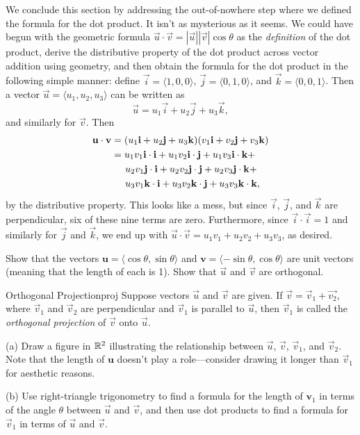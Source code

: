 \documentclass{watsonbook}
\begin{document}
We conclude this section by addressing the out-of-nowhere step where
we defined the formula for the dot product. It isn't as mysterious as
it seems. We could have begun with the geometric formula
$\vec{u} \cdot \vec{v} = |\vec{u}| |\vec{v}| \cos\theta$
as the \textit{definition} of the dot product, derive the distributive
property of the dot product across vector addition using geometry, and
then obtain the formula for the dot product in the following simple
manner: define $\vec{i} = \langle1,0,0\rangle$,
$\vec{j} = \langle0,1,0\rangle$, and
$\vec{k} = \langle0,0,1\rangle$. Then a vector
$\vec{u} = \langle u_1, u_2, u_3\rangle$ can be written as
\[
\vec{u} = u_1 \vec{i} + u_2 \vec{j} + u_3 \vec{k},
\]
and similarly for $\vec{v}$. Then 
\begin{align*}
  \vec{u} \cdot \vec{v} &= (u_1 \vec{i} + u_2 \vec{j} + u_3
  \vec{k})(v_1 \vec{i} + v_2 \vec{j} + v_3 \vec{k})  \\
  &= u_1 v_1 \vec{i} \cdot \vec{i} + u_1 v_2 \vec{i} \cdot
    \vec{j}  + u_1 v_3 \vec{i} \cdot \vec{k}  + \\ 
  &\hspace{5mm}  u_2 v_1 \vec{j} \cdot \vec{i} + u_2 v_2 \vec{j} \cdot
    \vec{j}  + u_2 v_3 \vec{j} \cdot \vec{k}  + \\ 
  &\hspace{5mm}  u_3 v_1 \vec{k} \cdot \vec{i} + u_3 v_2 \vec{k} \cdot
    \vec{j}  + u_3 v_3 \vec{k} \cdot \vec{k},
\end{align*}
by the distributive property. This looks like a mess, but since
$\vec{i}$,  $\vec{j}$, and  $\vec{k}$ are 
perpendicular, six of these nine terms are zero. Furthermore, since
$\vec{i}\cdot \vec{i} = 1$ and similarly for $\vec{j}$ and
$\vec{k}$, we end up with $  \vec{u} \cdot \vec{v}  = u_1 v_1
+ u_2 v_2 + u_3 v_3$, as desired.

\begin{exercise}{}{}
  Show that the vectors
  $\mathbf{u} = \langle \cos \theta, \sin \theta \rangle$ and
  $\mathbf{v} = \langle -\sin \theta, \cos \theta \rangle$ are unit
  vectors (meaning that the length of each is 1). Show that $\vec{u}$
  and $\vec{v}$ are orthogonal.
\end{exercise}

\begin{exercise}{Orthogonal Projection}{proj}
  Suppose vectors $\vec{u}$ and $\vec{v}$ are given. If
  $\vec{v} = \vec{v}_1 + \vec{v_2}$, where $\vec{v}_1$ and
  $\vec{v}_2$ are perpendicular and $\vec{v}_1$ is parallel to
  $\vec{u}$, then $\vec{v}_1$ is called the \textit{orthogonal
    projection} of $\vec{v}$ onto $\vec{u}$.

  (a) Draw a figure in $\R^2$ illustrating the relationship between
  $\vec{u}$, $\vec{v}$, $\vec{v}_1$, and $\vec{v}_2$. Note that the
  length of $\mathbf{u}$ doesn't play a role---consider drawing it
  longer than $\vec{v}_1$ for aesthetic reasons.

  (b) Use right-triangle trigonometry to find a formula for the length
  of $\mathbf{v}_1$ in terms of the angle $\theta$ between $\vec{u}$
  and $\vec{v}$, and then use dot products to find a formula for
  $\vec{v}_1$ in terms of $\vec{u}$ and $\vec{v}$. 
\end{exercise}
\end{document}

